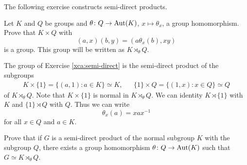 



The following exercise constructs semi-direct products. 

\begin{exercise}
\label{xca:semi-direct}
Let $K$ and $Q$ be groups and $\theta\colon Q\to\operatorname{Aut}(K)$, $x\mapsto\theta_x$, a group
homomorphism. Prove that $K\times Q$ 
with 
\[
(a,x)(b,y)=(a\theta_x(b),xy)
\]
is a group. This group will be written as $K\rtimes_\theta Q$.
\end{exercise}


The group of Exercise \ref{xca:semi-direct} is the
semi-direct product of the subgroups 
\begin{align*}
K\times\{1\}=\{(a,1):a\in K\}\simeq K,&&
\{1\}\times Q=\{(1,x):x\in Q\}\simeq Q
\end{align*}
of $K\rtimes_\theta Q$. Note that $K\times\{1\}$ is normal in $K\rtimes_\theta Q$. 
We can identity $K\rtimes\{1\}$ with $K$ 
and $\{1\}\rtimes Q$ with $Q$. Thus we can write 
\[
\theta_x(a)=xax^{-1}
\]
for all $x\in Q$ and $a\in K$.


\begin{exercise}
Prove that if $G$ is a semi-direct product of the normal subgroup 
$K$ with the subgroup $Q$, there exists a group homomorphism 
$\theta\colon Q\to\operatorname{Aut}(K)$
such that $G\simeq K\rtimes_\theta Q$.
\end{exercise}

